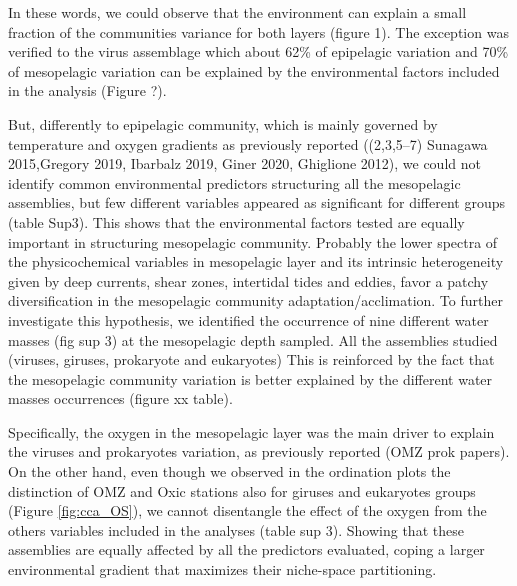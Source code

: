 \documentclass[fleqn,10pt]{wlscirep}
\begin{document}
In these words, we could observe that the environment can explain a small fraction of the communities variance for both layers (figure 1). The exception was verified to the virus assemblage which about 62\% of epipelagic variation and 70\% of mesopelagic variation can be explained by the environmental factors included in the analysis (Figure ?). 

But, differently to epipelagic community, which is mainly governed by temperature and oxygen gradients as previously reported ((2,3,5–7) Sunagawa 2015,Gregory 2019, Ibarbalz 2019, Giner 2020, Ghiglione 2012), we could not identify common environmental predictors structuring all the mesopelagic assemblies, but few different variables appeared as significant for different groups (table Sup3). This shows that the environmental factors tested are equally important in structuring mesopelagic community. Probably the lower spectra of the physicochemical variables in mesopelagic layer and its intrinsic heterogeneity given by deep currents, shear zones, intertidal tides and eddies, favor a patchy diversification in the mesopelagic community adaptation/acclimation. To further investigate this hypothesis, we identified the occurrence of nine different water masses (fig sup 3) at the mesopelagic depth sampled. All the assemblies studied (viruses, giruses, prokaryote and eukaryotes) This is reinforced by the fact that the mesopelagic community variation is better explained by the different water masses occurrences (figure xx table).

Specifically, the oxygen in the mesopelagic layer was the main driver to explain the viruses and prokaryotes variation, as previously reported (OMZ prok papers). On the other hand, even though we observed in the ordination plots  the distinction of OMZ and Oxic stations also for giruses and eukaryotes groups (Figure \ref{fig:cca_OS}), we cannot disentangle the effect of the oxygen from the others variables included in the analyses (table sup 3). Showing that these assemblies are equally affected by all the predictors evaluated, coping a larger environmental gradient that maximizes their niche-space partitioning.
\end{document}
